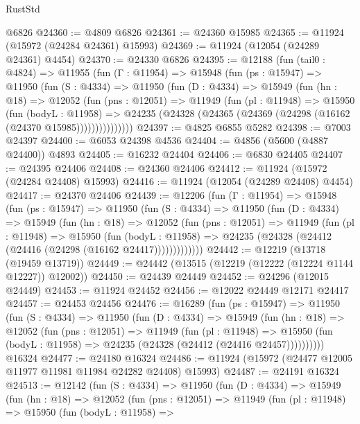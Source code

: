 \begin{lexlean}{RustStd}
\begin{coremodule}
{\begin{coremodule}
{{{{{{{{{{{{{{{{{{{{{{{{{{{{{{{{{{{{{{{{{{{{{{{{{{{{{{{{{{{{{{{{{{{{{{{{{{{{{{{{    @6826
@24360 := @4809 @6826
@24361 := @24360 @15985
@24365 := @11924 (@15972 (@24284 @24361) @15993)
@24369 := @11924 (@12054 (@24289 @24361) @4454)
@24370 := @24330 @6826
@24395 := @12188
    (fun (tail0 : @4824) =>
    @11955
      (fun (Γ : @11954) =>
      @15948
        (fun (ps : @15947) =>
        @11950
          (fun (S : @4334) =>
          @11950
            (fun (D : @4334) =>
            @15949
              (fun (hn : @18) =>
              @12052
                (fun (pns : @12051) =>
                @11949
                  (fun (pl : @11948) =>
                  @15950
                    (fun (bodyL : @11958) =>
                    @24235 (@24328 (@24365 (@24369 (@24298 (@16162 (@24370 @15985)))))))))))))))
@24397 := @4825 @6855 @5282
@24398 := @7003 @24397
@24400 := @6053 @24398 @4536
@24404 := @4856 (@5600 (@4887 @24400)) @4893
@24405 := @16232 @24404
@24406 := @6830 @24405
@24407 := @24395 @24406
@24408 := @24360 @24406
@24412 := @11924 (@15972 (@24284 @24408) @15993)
@24416 := @11924 (@12054 (@24289 @24408) @4454)
@24417 := @24370 @24406
@24439 := @12206
    (fun (Γ : @11954) =>
    @15948
      (fun (ps : @15947) =>
      @11950
        (fun (S : @4334) =>
        @11950
          (fun (D : @4334) =>
          @15949
            (fun (hn : @18) =>
            @12052
              (fun (pns : @12051) =>
              @11949
                (fun (pl : @11948) =>
                @15950
                  (fun (bodyL : @11958) =>
                  @24235 (@24328 (@24412 (@24416 (@24298 (@16162 @24417)))))))))))))
@24442 := @12219 (@13718 (@19459 @13719))
@24449 := @24442 (@13515 (@12219 (@12222 (@12224 @1144 @12227)) @12002))
@24450 := @24439 @24449
@24452 := @24296 (@12015 @24449)
@24453 := @11924 @24452
@24456 := @12022 @24449 @12171 @24417
@24457 := @24453 @24456
@24476 := @16289
    (fun (ps : @15947) =>
    @11950
      (fun (S : @4334) =>
      @11950
        (fun (D : @4334) =>
        @15949
          (fun (hn : @18) =>
          @12052
            (fun (pns : @12051) =>
            @11949
              (fun (pl : @11948) =>
              @15950 (fun (bodyL : @11958) => @24235 (@24328 (@24412 (@24416 @24457))))))))))
    @16324
@24477 := @24180 @16324
@24486 := @11924 (@15972 (@24477 @12005 @11977 @11981 @11984 @24282 @24408) @15993)
@24487 := @24191 @16324
@24513 := @12142
    (fun (S : @4334) =>
    @11950
      (fun (D : @4334) =>
      @15949
        (fun (hn : @18) =>
        @12052
          (fun (pns : @12051) =>
          @11949
            (fun (pl : @11948) =>
            @15950
              (fun (bodyL : @11958) =>
}}}}}}}}}}}}}}}}}}}}}}}}}}}}}}}}}}}}}}}}}}}}}}}}}}}}}}}}}}}}}}}}}}}}}}}}}}}}}}}}
\end{coremodule}}
\end{coremodule}
\end{lexlean}
